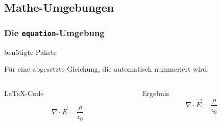 \subsection{Mathe-Umgebungen}
\begin{frame}[fragile]
    \frametitle{Die \texttt{equation}-Umgebung 
        \hfill{}
    }
   \begin{block}{benötigte Pakete}
    \begin{lstverbatim}
        \usepackage{amsmath}
        \usepackage{amssymb}
        \usepackage{mathtools}
    \end{lstverbatim}
   \end{block}
    Für eine abgesetzte Gleichung, die automatisch nummeriert wird.
    \begin{columns}[T]
        \begin{column}{0.6\textwidth}
            \begin{block}{\LaTeX-Code}
                \begin{lstverbatim}
                \begin{equation}
                    \nabla \cdot \vec{E} = 
                    \frac{\rho} {\epsilon_0}
                    \label{eq:maxwell1}
                \end{equation}
                \end{lstverbatim}
            \end{block}
        \end{column}
        \begin{column}{0.35\textwidth}
            \begin{block}{Ergebnis}
                \begin{equation}
                    \nabla \cdot \vec{E} = 
                    \frac{\rho}{\epsilon_0}
                    \label{eq:maxwell1}
                \end{equation}
            \end{block}
        \end{column}
    \end{columns}
\end{frame}
